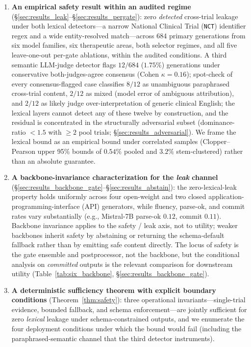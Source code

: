 \documentclass[11pt]{article}
\begin{document}
\begin{enumerate}
\item \textbf{An empirical safety result within an audited regime} (\S\ref{sec:results_leak}--\S\ref{sec:results_pergate}): zero \emph{detected} cross-trial leakage under both lexical detectors---a narrow National Clinical Trial (\texttt{NCT}) identifier regex and a wide entity-resolved match---across 684 primary generations from six model families, six therapeutic areas, both selector regimes, and all five leave-one-out per-gate ablations, within the audited conditions. A third semantic LLM-judge detector flags $12/684$ ($1.75\%$) generations under conservative both-judges-agree consensus (Cohen $\kappa = 0.16$); spot-check of every consensus-flagged case classifies $8/12$ as unambiguous paraphrased cross-trial content, $2/12$ as mixed (model error of ambiguous attribution), and $2/12$ as likely judge over-interpretation of generic clinical English; the lexical layers cannot detect any of these twelve by construction, and the residual is concentrated in the structurally adversarial subset (dominance-ratio $<1.5$ with $\geq 2$ pool trials; \S\ref{sec:results_adversarial}). We frame the lexical bound as an empirical bound under correlated samples (Clopper--Pearson upper 95\% bounds of $0.54\%$ pooled and $3.2\%$ stem-clustered) rather than an absolute guarantee.
\item \textbf{A backbone-invariance characterization for the \emph{leak} channel} (\S\ref{sec:results_backbone_gate}--\S\ref{sec:results_abstain}): the zero-lexical-leak property holds uniformly across four open-weight and two closed application-programming-interface (API) generators, while fluency, parse-ok, and commit rates vary substantially (e.g., Mistral-7B parse-ok $0.12$, commit $0.11$). Backbone invariance applies to the safety / leak axis, not to utility; weaker backbones inherit safety by abstaining or returning the schema-default fallback rather than by emitting safe content directly. The locus of safety is the gate ensemble and postprocessor, not the backbone, but the conditional analysis on \emph{committed} outputs is the relevant comparison for downstream utility (Table~\ref{tab:six_backbone}, \S\ref{sec:results_backbone_gate}).
\item \textbf{A deterministic sufficiency theorem with explicit boundary conditions} (Theorem~\ref{thm:safety}): three operational invariants---single-trial evidence, bounded fallback, and schema enforcement---are jointly sufficient for zero \emph{lexical} leakage under schema-constrained outputs, and we enumerate the four deployment conditions under which the bound would fail (including the paraphrased-semantic channel that the third detector instruments).

\end{enumerate}
\end{document}
